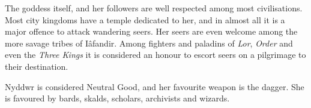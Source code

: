 The goddess itself, and her followers are well respected among most
civilisations. Most city kingdoms have a temple dedicated to her, and in almost
all it is a major offence to attack wandering seers. Her seers are even welcome
among the more savage tribes of Iâfandir. Among fighters and paladins of
\emph{Lor}, \emph{Order} and even the \emph{Three Kings} it is considered an
honour to escort seers on a pilgrimage to their destination.

\begin{35e}
  Nyddwr is considered Neutral Good, and her favourite weapon is the dagger.
  She is favoured by bards, skalds, scholars, archivists and wizards.
\end{35e}
